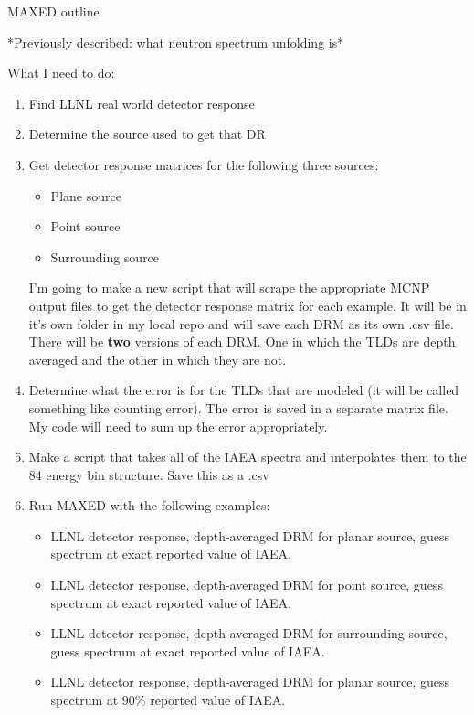 \documentclass[11pt]{article}
\begin{document}
\begin{center}
MAXED outline
\end{center}
*Previously described: what neutron spectrum unfolding is*\\

\hfill


What I need to do:
\begin{enumerate}
\item Find LLNL real world detector response
\item Determine the source used to get that DR
\item Get detector response matrices for the following three sources:
\begin{itemize}
\item[\checkmark] Plane source
\item Point source
\item[\checkmark] Surrounding source
\end{itemize}
I'm going to make a new script that will scrape the appropriate MCNP output files to get the detector response matrix for each example. It will be in it's own folder in my local repo and will save each DRM as its own .csv file. There will be \textbf{two} versions of each DRM. One in which the TLDs are depth averaged and the other in which they are not.
\item[\checkmark] Determine what the error is for the TLDs that are modeled (it will be called something like counting error). The error is saved in a separate matrix file. My code will need to sum up the error appropriately.
\item Make a script that takes all of the IAEA spectra and interpolates them to the 84 energy bin structure. Save this as a .csv
\item Run MAXED with the following examples:
	\begin{itemize}
	\item LLNL detector response, depth-averaged DRM for planar source, guess spectrum at exact reported value of IAEA.
	\item LLNL detector response, depth-averaged DRM for point source, guess spectrum at exact reported value of IAEA.
	\item LLNL detector response, depth-averaged DRM for surrounding source, guess spectrum at exact reported value of IAEA.
	\item LLNL detector response, depth-averaged DRM for planar source, guess spectrum at 90\% reported value of IAEA.

\end{itemize}
\end{enumerate}
\end{document}
